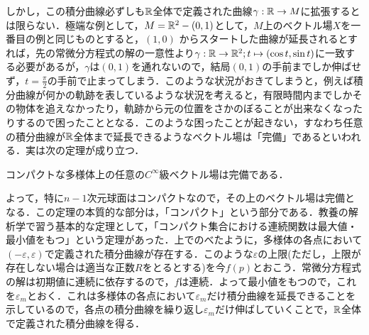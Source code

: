 しかし，この積分曲線必ずしも${\mathbb R}$全体で定義された曲線$\gamma:{\mathbb R}\rightarrow M$に拡張するとは限らない．極端な例として，$M={\mathbb R}^2-{(0,1)}$として，$M$上のベクトル場$X$を一番目の例と同じものとすると，$(1,0)$
からスタートした曲線が延長されるとすれば，先の常微分方程式の解の一意性より$\gamma:{\mathbb R}\rightarrow {\mathbb R}^2;t\mapsto (\cos t,\sin t)$に一致する必要があるが，$\gamma$は$(0,1)$を通れないので，結局$(0,1)$の手前までしか伸ばせず，$t=\frac{\pi}{2}$の手前で止まってしまう．このような状況がおきてしまうと，例えば積分曲線が何かの軌跡を表しているような状況を考えると，有限時間内までしかその物体を追えなかったり，軌跡から元の位置をさかのぼることが出来なくなったりするので困ったこととなる．このような困ったことが起きない，すなわち任意の積分曲線が${\mathbb R}$全体まで延長できるようなベクトル場は「完備」であるといわれる．実は次の定理が成り立つ．
\begin{s_theo}
コンパクトな多様体上の任意の$C^\infty$級ベクトル場は完備である．
\end{s_theo}
よって，特に$n-1$次元球面はコンパクトなので，その上のベクトル場は完備となる．この定理の本質的な部分は，「コンパクト」という部分である．教養の解析学で習う基本的な定理として，「コンパクト集合における連続関数は最大値・最小値をもつ」という定理があった．上でのべたように，多様体の各点において$(-\varepsilon,\varepsilon)$で定義された積分曲線が存在する．このような$\varepsilon$の上限(ただし，上限が存在しない場合は適当な正数$R$をとるとする)を今$f(p)$とおこう．常微分方程式の解は初期値に連続に依存するので，$f$は連続．よって最小値をもつので，これを$\varepsilon_m$とおく．これは多様体の各点において$\varepsilon_m$だけ積分曲線を延長できることを示しているので，各点の積分曲線を繰り返し$\varepsilon_m$だけ伸ばしていくことで，${\mathbb R}$全体で定義された積分曲線を得る．


